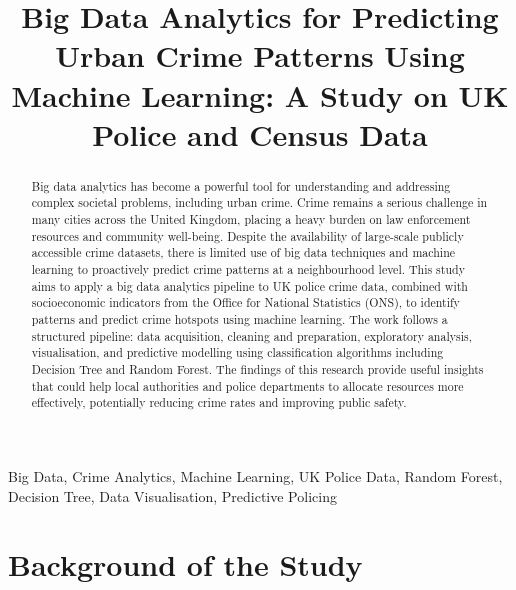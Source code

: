\documentclass[conference]{IEEEtran}
\begin{document}
\title{Big Data Analytics for Predicting Urban Crime Patterns Using
Machine Learning: A Study on UK Police and Census Data\\
}

\author{
}

\maketitle

\begin{abstract}
Big data analytics has become a powerful tool for understanding and addressing complex societal problems, including urban crime. Crime remains a serious challenge in many cities across the United Kingdom, placing a heavy burden on law enforcement resources and community well-being. Despite the availability of large-scale publicly accessible crime datasets, there is limited use of big data techniques and machine learning to proactively predict crime patterns at a neighbourhood level. This study aims to apply a big data analytics pipeline to UK police crime data, combined with socioeconomic indicators from the Office for National Statistics (ONS), to identify patterns and predict crime hotspots using machine learning. The work follows a structured pipeline: data acquisition, cleaning and preparation, exploratory analysis, visualisation, and predictive modelling using classification algorithms including Decision Tree and Random Forest. The findings of this research provide useful insights that could help local authorities and police departments to allocate resources more effectively, potentially reducing crime rates and improving public safety.
\end{abstract}

\begin{IEEEkeywords}
Big Data, Crime Analytics, Machine Learning, UK Police Data, Random Forest, Decision Tree, Data Visualisation, Predictive Policing
\end{IEEEkeywords}

\section{Background of the Study}
\end{document}
